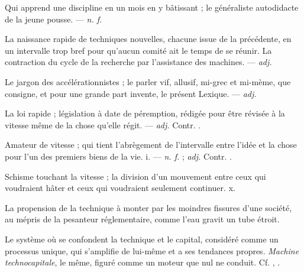  Qui apprend une discipline en un mois en y bâtissant ; le généraliste autodidacte de la jeune pousse. ---  \textit{n. f.}

  La naissance rapide de techniques nouvelles, chacune issue de la précédente, en un intervalle trop bref pour qu'aucun comité ait le temps de se réunir.   La contraction du cycle de la recherche par l'assistance des machines. ---  \textit{adj.}

 Le jargon des accélérationnistes ; le parler vif, allusif, mi-grec et mi-mème, que consigne, et pour une grande part invente, le présent Lexique. ---  \textit{adj.}

 La loi rapide ; législation à date de péremption, rédigée pour être révisée à la vitesse même de la chose qu'elle régit. ---  \textit{adj.} Contr. .

 Amateur de vitesse ; qui tient l'abrègement de l'intervalle entre l'idée et la chose pour l'un des premiers biens de la vie.   i. ---  \textit{n. f.} ;  \textit{adj.} Contr. .

 Schisme touchant la vitesse ; la division d'un mouvement entre ceux qui voudraient hâter et ceux qui voudraient seulement continuer.   x.

 La propension de la technique à monter par les moindres fissures d'une société, au mépris de la pesanteur réglementaire, comme l'eau gravit un tube étroit.

 Le système où se confondent la technique et le capital, considéré comme un processus unique, qui s'amplifie de lui-même et a ses tendances propres. \textit{Machine technocapitale}, le même, figuré comme un moteur que nul ne conduit. Cf. , .

